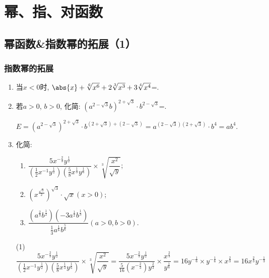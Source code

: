 \setcounter{page}{1}
\chapter*{幂、指、对函数} %

\section*{幂函数\&指数幂的拓展（1）}
\subsection*{指数幂的拓展}

\begin{enumerate}
\item 当$x<0$时, $\abs{x}+\sqrt[6]{x^6}+2\sqrt[3]{x^3}+3\sqrt[4]{x^4}$=. 

\item 若$a>0$, $b>0$, 化简: $\left(a^{2-\sqrt{3}}b\right)^{2+\sqrt{3}}\cdot b^{2-\sqrt{3}}$=. 
\begin{jieda}
$E=(a^{2-\sqrt{3}})^{2+\sqrt{3}}\cdot b^{(2+\sqrt{3})+(2-\sqrt{3})}=a^{(2-\sqrt{3})(2+\sqrt{3})}\cdot b^4=ab^4$. 
\end{jieda}

\item 化简:
\begin{enumerate}
\item $\dfrac{5x^{-\frac{2}{3}}y^{\frac{1}{2}}}{\left(\frac{1}{2}x^{-1}y^{\frac{1}{2}}\right)\left(\frac{5}{8}x^{\frac{1}{3}}y^{\frac{1}{6}}\right)}
\times \sqrt[3]{\dfrac{x^2}{\sqrt{y}}}$; 

\item $\left(x^{\frac{\sqrt{3}}{2}}\right)^{\sqrt{3}}\cdot\sqrt{x}(x>0)$; 

\item $\dfrac{\left(a^{\frac{2}{3}}b^{\frac{1}{2}}\right)\left(-3a^{\frac{1}{2}}b^{\frac{1}{3}}\right)}{\frac{1}{3}a^{\frac{1}{6}}b^{\frac{5}{6}}}(a>0,b>0)$.
\end{enumerate}
\begin{jieda}
(1) $\dfrac{5x^{-\frac{2}{3}}y^{\frac{1}{2}}}{\left(\frac{1}{2}x^{-1}y^{\frac{1}{2}}\right)\left(\frac{5}{8}x^{\frac{1}{3}}y^{\frac{1}{6}}\right)}
\times \sqrt[3]{\dfrac{x^2}{\sqrt{y}}} = \dfrac{5x^{-\frac{2}{3}}y^{\frac{1}{2}}}{\frac{5}{16}(x^{-\frac{2}{3}})y^{\frac{2}{3}}} \times \dfrac{x^{\frac{2}{3}}}{y^{\frac{1}{6}}} = 16y^{-\frac{1}{6}} \times y^{-\frac{1}{6}} \times x^{\frac{2}{3}} = 16x^{\frac{2}{3}}y^{-\frac{1}{3}}$


\end{jieda}
\end{enumerate}
